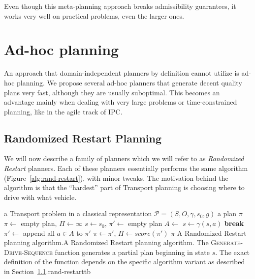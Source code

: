 Even though this meta-planning approach breaks
admissibility guarantees, it works very well on
practical problems, even the larger ones.



















\section{Ad-hoc planning}\label{ad-hoc}

An approach that domain-independent planners by definition cannot utilize
is ad-hoc planning. We propose several
ad-hoc planners that generate decent quality plans very fast,
although they are usually suboptimal.
This becomes an advantage mainly when dealing with very large
problems or time-constrained planning,
like in the agile track of IPC.

\subsection{Randomized Restart Planning}\label{rand-restart}

We will now describe a family of planners which we will refer to as \textit{Randomized Restart} planners.
Each of these planners essentially performs the same algorithm (Figure~\ref{alg:rand-restart}),
with minor tweaks. The motivation
behind the algorithm is that the ``hardest'' part of Transport planning
is choosing where to drive with what vehicle.

%
{%
\Input a Transport problem in a classical representation $\mathcal{P} = (S, O, \gamma, s_0, g)$
\Output a plan $\pi$
\State $\pi \gets $ empty plan, $\Pi \gets \infty$
 
\State $s \gets s_0$, $\pi' \gets $ empty plan
\State $A \gets $ 
 
\State $s \gets \gamma(s, a)$
\EndFor
{} \textbf{break} 
\EndIf
\State $\pi' \gets $ append all $a \in A$ to $\pi'$
\EndWhile
{}
\State $\pi \gets \pi'$, $\Pi \gets score(\pi')$ 
\EndIf
\EndWhile
\State \Return $\pi$
\EndFunction
}%
{A Randomized Restart planning algorithm.}{A Randomized Restart planning algorithm. The \textsc{Generate-Drive-Sequence} function
generates a partial plan beginning in state $s$.
The exact definition of the function
depends on the specific algorithm variant as described in Section~\ref{rand-restart}.}{rand-restart}{tb}

